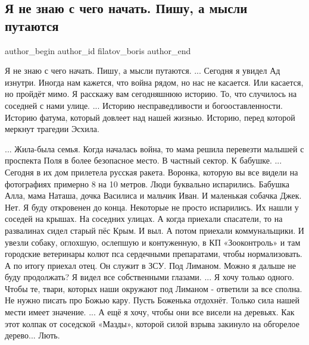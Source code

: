  
 
 
 
 
 
\subsection{Я не знаю с чего начать. Пишу, а мысли путаются}
\label{sec:29_09_2022.fb.filatov_boris.1.s_chego_nachat}
 

\ifcmt
 author_begin
   author_id filatov_boris
 author_end
\fi

\obeycr
Я не знаю с чего начать.
Пишу, а мысли путаются.
...
Сегодня я увидел Ад изнутри.
Иногда нам кажется, что война рядом, но нас не касается.
Или касается, но пройдёт мимо.
Я расскажу вам сегодняшнюю историю.
То, что случилось на соседней с нами улице.
... 
Историю несправедливости и богооставленности.
Историю фатума, который довлеет над нашей жизнью.
Историю, перед которой меркнут трагедии Эсхила.
\restorecr

...
Жила-была семья. 
Когда началась война, то мама решила перевезти малышей с проспекта Поля в более безопасное место.
В частный сектор. К бабушке.
...
Сегодня в их дом прилетела русская ракета.
Воронка, которую вы все видели на фотографиях примерно 8 на 10 метров.
Люди буквально испарились. Бабушка Алла, мама Наташа, дочка Василиса  и мальчик Иван.
И маленькая собачка Джек.
Нет. Я буду откровенен до конца. Некоторые не просто испарились.
Их нашли у соседей на крышах. 
На соседних улицах.
А когда приехали спасатели, то на развалинах сидел старый пёс Крым.
И выл.
А потом приехали коммунальщики. 
И увезли собаку, оглохшую, ослепшую и контуженную, в КП «Зооконтроль» и там городские ветеринары колют пса сердечными препаратами, чтобы нормализовать.
А по итогу приехал отец.
Он служит в ЗСУ. Под Лиманом.
Можно я дальше не буду продолжать?
Я видел все собственными глазами.
...
Я хочу только одного.
Чтобы те, твари, которых наши окружают под Лиманом - ответили за все сполна.
Не нужно писать про Божью кару.
Пусть Боженька отдохнёт.
Только сила нашей мести имеет значение.
...
А ещё я хочу, чтобы они все висели на деревьях.
Как этот колпак от соседской «Мазды», которой силой взрыва закинуло на обгорелое дерево...
Лють.

